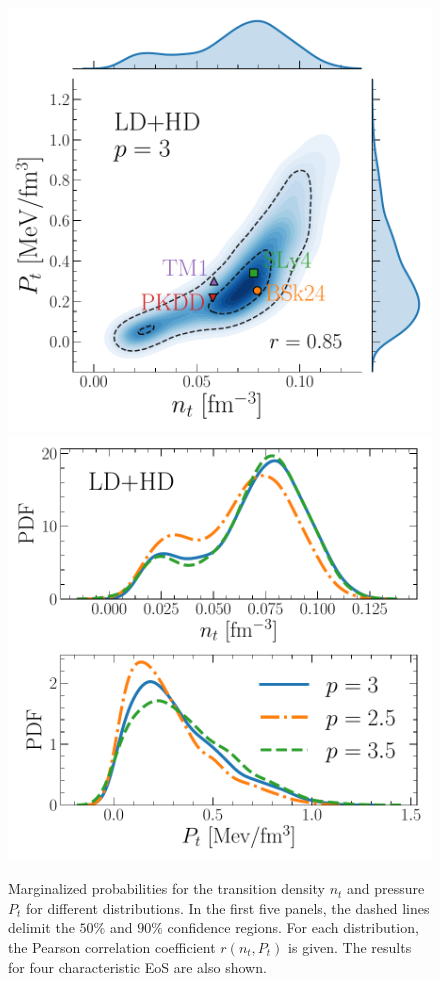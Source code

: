 \begin{figure}[!t]
\begin{center}
    \includegraphics[width=0.411\linewidth]{figures/ntpt_ldhdp3.pdf}
    \includegraphics[width=0.411\linewidth]{figures/ntpt_marg.pdf}
  \end{center}
  \caption[Marginalized probability distributions for the crust-core transition 
  density and pressure for different filters]{Marginalized probabilities for 
    the transition density $n_t$ and pressure $P_t$ for different 
    distributions. In the first five panels, the dashed lines delimit the 
    $50\%$ and $90\%$ confidence regions. For each distribution, the Pearson 
    correlation coefficient $r(n_t,P_t)$ is given. The results for four 
    characteristic EoS are also shown.}\label{fig:ntpt}
\end{figure}

